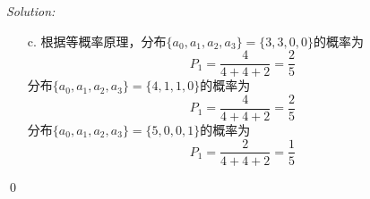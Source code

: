 \documentclass[12pt,a4paper]{article}
\newenvironment{sol}
    {\emph{Solution:}
    }
    {
    \qed
    }
\begin{document}
\begin{sol}
\begin{itemize}
\begin{table}[h]
\begin{tabular}{|c|c|c|c|c|c|c|c|c|c|c|}
                           &                      &                               & $8$  & $4$ & $0$         & $1$        & $0$         & $1$         & $0$         & $0$         \\ \cline{2-2} \cline{4-11} 
                           & \multirow{2}{*}{$3$} &                               & $9$  & $5$ & $0$         & $0$        & $0$         & $0$         & $1$         & $0$         \\ \cline{4-11} 
                           &                      &                               & $10$ & $5$ & $0$         & $0$        & $0$         & $0$         & $0$         & $1$         \\ \hline
\end{tabular}
\end{table}
\item[c.] 根据等概率原理，分布$\{a_0,a_1,a_2,a_3\}=\{3,3,0,0\}$的概率为
\begin{equation}
P_1=\frac{4}{4+4+2}=\frac{2}{5}
\end{equation}
分布$\{a_0,a_1,a_2,a_3\}=\{4,1,1,0\}$的概率为
\begin{equation}
P_1=\frac{4}{4+4+2}=\frac{2}{5}
\end{equation}
分布$\{a_0,a_1,a_2,a_3\}=\{5,0,0,1\}$的概率为
\begin{equation}
P_1=\frac{2}{4+4+2}=\frac{1}{5}
\end{equation}
\end{itemize}
\end{sol}
\end{document}
